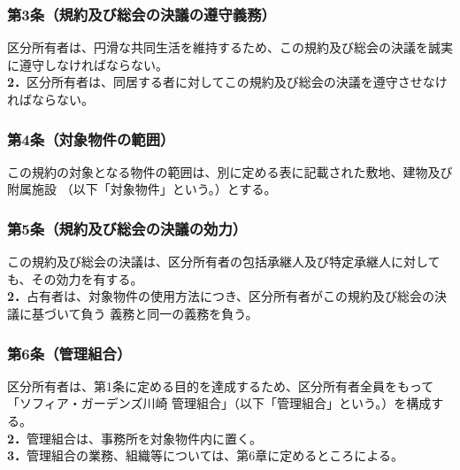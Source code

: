 \documentclass[12pt,uplatex,dvipdfmx]{jsarticle}
\begin{document}
\renewenvironment{description}
{\begin{list}{}{
      \let\makelabel\descriptionlabel
      \setlength\labelwidth{2em}%
      \setlength\itemsep{0pt}%
      \setlength\parsep{0pt}%
      \setlength\labelsep{2pt}%
      \setlength\leftmargin{\labelwidth+\labelsep}
      }
}
{\end{list}}

\subsubsection*{ 第3条（規約及び総会の決議の遵守義務）}
区分所有者は、円滑な共同生活を維持するため、この規約及び総会の決議を誠実に遵守しなければならない。\\
\textbf{2．}区分所有者は、同居する者に対してこの規約及び総会の決議を遵守させなければならない。
\subsubsection*{ 第4条（対象物件の範囲）}
この規約の対象となる物件の範囲は、別に定める表に記載された敷地、建物及び附属施設
（以下「対象物件」という。）とする。
\subsubsection*{ 第5条（規約及び総会の決議の効力）}
この規約及び総会の決議は、区分所有者の包括承継人及び特定承継人に対しても、その効力を有する。\\
\textbf{2．}占有者は、対象物件の使用方法につき、区分所有者がこの規約及び総会の決議に基づいて負う
義務と同一の義務を負う。
\subsubsection*{ 第6条（管理組合）}
区分所有者は、第1条に定める目的を達成するため、区分所有者全員をもって「ソフィア・ガーデンズ川崎
管理組合」（以下「管理組合」という。）を構成する。\\
\textbf{2．}管理組合は、事務所を対象物件内に置く。\\
\textbf{3．}管理組合の業務、組織等については、第6章に定めるところによる。\\
\end{document}
